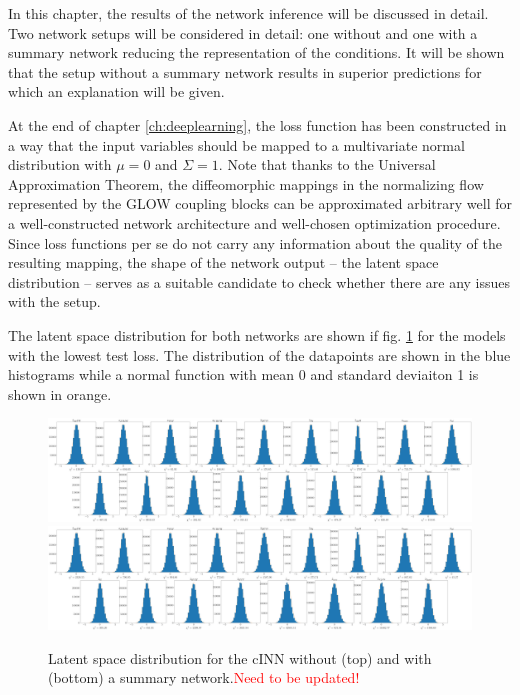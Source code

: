 
In this chapter, the results of the network inference will be discussed in detail. Two network setups will be considered in detail: one without and one with a summary network reducing the representation of the conditions. It will be shown that the setup without a summary network results in superior predictions for which an explanation will be given. 

\Subsection{\textcolor{red}{Latent Space Distribution}}

At the end of chapter \ref{ch:deeplearning}, the loss function has been constructed in a way that the input variables should be mapped to a multivariate normal distribution with $\mu = 0$ and $\Sigma=1$. Note that thanks to the Universal Approximation Theorem, the diffeomorphic mappings in the normalizing flow represented by the GLOW coupling blocks can be approximated arbitrary well for a well-constructed network architecture and well-chosen optimization procedure. Since loss functions per se do not carry any information about the quality of the resulting mapping, the shape of the network output -- the latent space distribution -- serves as a suitable candidate to check whether there are any issues with the setup.

The latent space distribution for both networks are shown if fig. \ref{fig:latents} for the models with the lowest test loss. The distribution of the datapoints are shown in the blue histograms while a normal function with mean 0 and standard deviaiton 1 is shown in orange.

\begin{figure}[h!]
	\centering
	\includegraphics[width=\textwidth]{figures/inference/ls.png}
	\includegraphics[width=\textwidth]{figures/inference/ls_SN.png}
	\caption{Latent space distribution for the cINN without (top) and with (bottom) a summary network.\textcolor{red}{Need to be updated!}}
	\label{fig:latents}
\end{figure}

